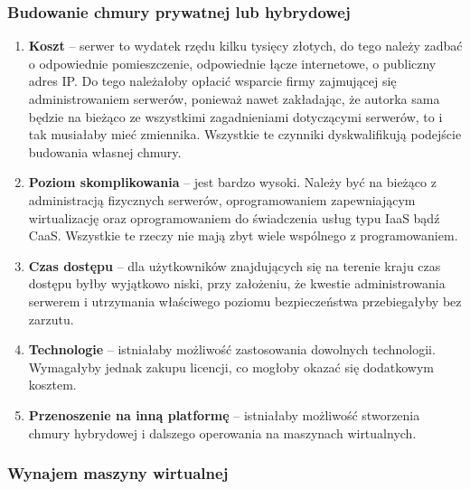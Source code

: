 \documentclass[12pt,a4paper,twoside,titlepage,openright]{book}
\begin{document}
\subsubsection{Budowanie chmury prywatnej lub hybrydowej}

\begin{enumerate}
	\item \textbf{Koszt} -- serwer to wydatek rzędu kilku tysięcy złotych, do tego należy zadbać o odpowiednie pomieszczenie, odpowiednie łącze internetowe, o publiczny adres IP. Do tego należałoby opłacić wsparcie firmy zajmującej się administrowaniem serwerów, ponieważ nawet zakładając, że autorka sama będzie na bieżąco ze wszystkimi zagadnieniami dotyczącymi serwerów, to i tak musiałaby mieć zmiennika. Wszystkie te czynniki dyskwalifikują podejście budowania własnej chmury. 
	\item \textbf{Poziom skomplikowania} -- jest bardzo wysoki. Należy być na bieżąco z administracją fizycznych serwerów, oprogramowaniem zapewniającym wirtualizację oraz oprogramowaniem do świadczenia usług typu IaaS bądź CaaS. Wszystkie te rzeczy nie mają zbyt wiele wspólnego z programowaniem.
	\item \textbf{Czas dostępu} -- dla użytkowników znajdujących się na terenie kraju czas dostępu byłby wyjątkowo niski, przy założeniu, że kwestie administrowania serwerem i utrzymania właściwego poziomu bezpieczeństwa przebiegałyby bez zarzutu.
	\item \textbf{Technologie} -- istniałaby możliwość zastosowania dowolnych technologii. Wymagałyby jednak zakupu licencji, co mogłoby okazać się dodatkowym kosztem.
	\item \textbf{Przenoszenie na inną platformę} -- istniałaby możliwość stworzenia chmury hybrydowej i dalszego operowania na maszynach wirtualnych.
\end{enumerate}


\subsubsection{Wynajem maszyny wirtualnej}
\end{document}
